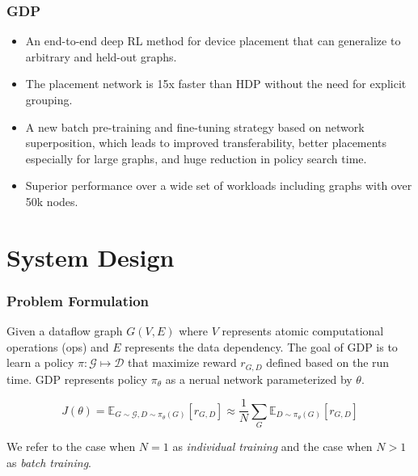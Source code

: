 \documentclass[12pt,aspectratio=169]{beamer}
\begin{document}
    \begin{frame}
        \frametitle{GDP}

        \begin{itemize}
            \setlength{\itemsep}{.8em}
            \item An end-to-end deep RL method for device placement that can generalize to arbitrary and held-out graphs.
            \item The placement network is 15x faster than HDP without the need for explicit grouping.
            \item A new batch pre-training and fine-tuning strategy based on network superposition, which leads to
                  improved transferability, better placements especially for large graphs, and huge reduction in policy
                  search time.
            \item Superior performance over a wide set of workloads including graphs with over 50k nodes.
        \end{itemize}
    \end{frame}

    \section{System Design}

    \begin{frame}
        \frametitle{Problem Formulation}

        Given a dataflow graph $G(V, E)$ where $V$ represents atomic computational operations (ops) and $E$ represents
        the data dependency. The goal of GDP is to learn a policy $\pi: \mathcal{G} \mapsto \mathcal{D}$ that maximize
        reward $r_{G,D}$ defined based on the run time. GDP represents policy $\pi_\theta$ as a nerual network
        parameterized by $\theta$.

        $$
            J(\theta) = \mathbb{E}_{G\sim{} \mathcal{G}, D\sim \pi_\theta(G)}[r_{G,D}] \approx
            \frac{1}{N}\sum_{G}\mathbb{E}_{D\sim \pi_\theta(G)}[r_{G,D}]
        $$

        We refer to the case when $N=1$ as \textit{individual training} and the case when $N>1$ as \textit{batch training}.
    \end{frame}
\end{document}
